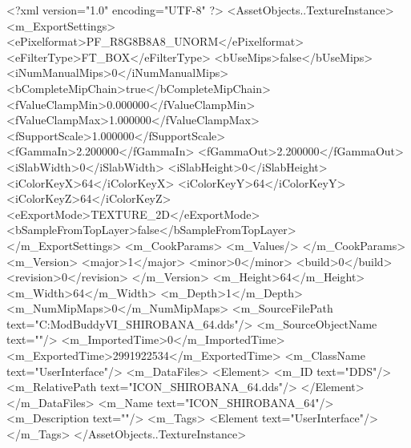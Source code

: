 <?xml version="1.0" encoding="UTF-8" ?>
<AssetObjects..TextureInstance>
	<m_ExportSettings>
		<ePixelformat>PF_R8G8B8A8_UNORM</ePixelformat>
		<eFilterType>FT_BOX</eFilterType>
		<bUseMips>false</bUseMips>
		<iNumManualMips>0</iNumManualMips>
		<bCompleteMipChain>true</bCompleteMipChain>
		<fValueClampMin>0.000000</fValueClampMin>
		<fValueClampMax>1.000000</fValueClampMax>
		<fSupportScale>1.000000</fSupportScale>
		<fGammaIn>2.200000</fGammaIn>
		<fGammaOut>2.200000</fGammaOut>
		<iSlabWidth>0</iSlabWidth>
		<iSlabHeight>0</iSlabHeight>
		<iColorKeyX>64</iColorKeyX>
		<iColorKeyY>64</iColorKeyY>
		<iColorKeyZ>64</iColorKeyZ>
		<eExportMode>TEXTURE_2D</eExportMode>
		<bSampleFromTopLayer>false</bSampleFromTopLayer>
	</m_ExportSettings>
	<m_CookParams>
		<m_Values/>
	</m_CookParams>
	<m_Version>
		<major>1</major>
		<minor>0</minor>
		<build>0</build>
		<revision>0</revision>
	</m_Version>
	<m_Height>64</m_Height>
	<m_Width>64</m_Width>
	<m_Depth>1</m_Depth>
	<m_NumMipMaps>0</m_NumMipMaps>
	<m_SourceFilePath text="C:\Users\asus\Documents\Firaxis ModBuddy\Civilization VI\temppic\ICON_SHIROBANA_64.dds"/>
	<m_SourceObjectName text=""/>
	<m_ImportedTime>0</m_ImportedTime>
	<m_ExportedTime>2991922534</m_ExportedTime>
	<m_ClassName text="UserInterface"/>
	<m_DataFiles>
		<Element>
			<m_ID text="DDS"/>
			<m_RelativePath text="ICON_SHIROBANA_64.dds"/>
		</Element>
	</m_DataFiles>
	<m_Name text="ICON_SHIROBANA_64"/>
	<m_Description text=""/>
	<m_Tags>
		<Element text="UserInterface"/>
	</m_Tags>
</AssetObjects..TextureInstance>

